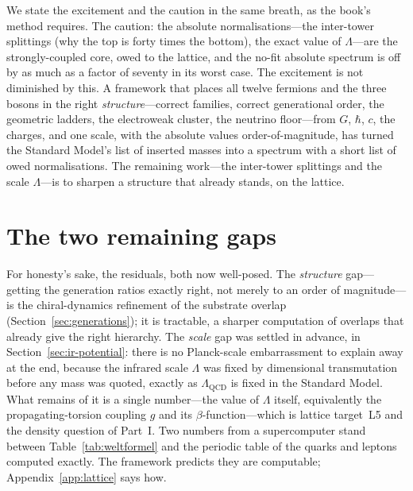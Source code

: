 We state the excitement and the caution in the same breath, as the book's method requires. The
caution: the absolute normalisations---the inter-tower splittings (why the top is forty times the
bottom), the exact value of $\Lambda$---are the strongly-coupled core, owed to the lattice, and
the no-fit absolute spectrum is off by as much as a factor of seventy in its worst case. The
excitement is not diminished by this. A framework that places all twelve fermions and the three
bosons in the right \emph{structure}---correct families, correct generational order, the geometric
ladders, the electroweak cluster, the neutrino floor---from $G$, $\hbar$, $c$, the charges, and one
scale, with the absolute values order-of-magnitude, has turned the Standard Model's list of inserted
masses into a spectrum with a short list of owed normalisations. The remaining work---the inter-tower
splittings and the scale $\Lambda$---is to sharpen a structure that already stands, on the lattice.

\section{The two remaining gaps}

For honesty's sake, the residuals, both now well-posed. The \emph{structure} gap---getting the
generation ratios exactly right, not merely to an order of magnitude---is the chiral-dynamics
refinement of the substrate overlap (Section~\ref{sec:generations}); it is tractable, a sharper
computation of overlaps that already give the right hierarchy. The \emph{scale} gap was settled
in advance, in Section~\ref{sec:ir-potential}: there is no Planck-scale embarrassment to explain
away at the end, because the infrared scale $\Lambda$ was fixed by dimensional transmutation
before any mass was quoted, exactly as $\Lambda_{\mathrm{QCD}}$ is fixed in the Standard Model.
What remains of it is a single number---the value of $\Lambda$ itself, equivalently the
propagating-torsion coupling $g$ and its $\beta$-function---which is lattice target~L5 and the
density question of Part~I. Two numbers from a supercomputer stand between
Table~\ref{tab:weltformel} and the periodic table of the quarks and leptons computed exactly. The
framework predicts they are computable; Appendix~\ref{app:lattice} says how.
